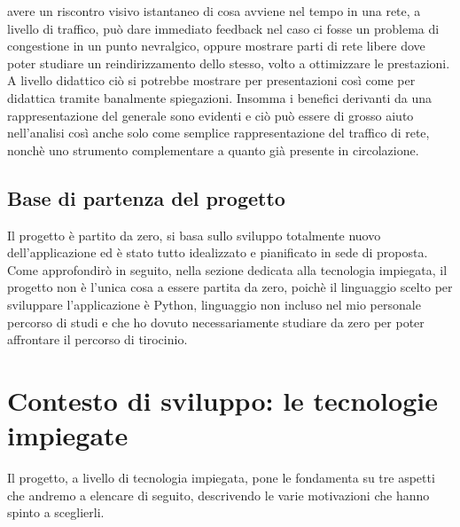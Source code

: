 \documentclass[binding=0.6cm]{sapthesis}
\begin{document}
avere un riscontro visivo istantaneo di cosa avviene nel tempo in una rete, a livello di traffico, può dare immediato feedback nel
caso ci fosse un problema di congestione in un punto nevralgico, oppure mostrare parti di rete libere dove poter studiare un
reindirizzamento dello stesso, volto a ottimizzare le prestazioni. A livello didattico ciò si potrebbe mostrare per presentazioni così come per didattica tramite banalmente spiegazioni. 
Insomma i benefici derivanti da una rappresentazione del generale sono evidenti e ciò
può essere di grosso aiuto nell'analisi così anche solo come semplice rappresentazione del traffico di rete, nonchè uno strumento complementare a quanto già presente in circolazione.

\section{Base di partenza del progetto}
Il progetto è partito da zero, si basa sullo sviluppo totalmente nuovo dell'applicazione ed è stato tutto idealizzato e pianificato in sede di proposta.
Come approfondirò in seguito, nella sezione dedicata alla tecnologia impiegata, il progetto non è l'unica cosa a essere partita da zero, poichè il linguaggio
scelto per sviluppare l'applicazione è Python\cite{PythonWebsite}, linguaggio non incluso nel mio 
personale percorso di studi e che ho dovuto necessariamente studiare da zero per poter affrontare il percorso di tirocinio.

\chapter{Contesto di sviluppo: le tecnologie impiegate}
Il progetto, a livello di tecnologia impiegata, pone le fondamenta su tre aspetti che andremo a 
elencare di seguito, descrivendo le varie motivazioni che hanno spinto a sceglierli. 
\end{document}
